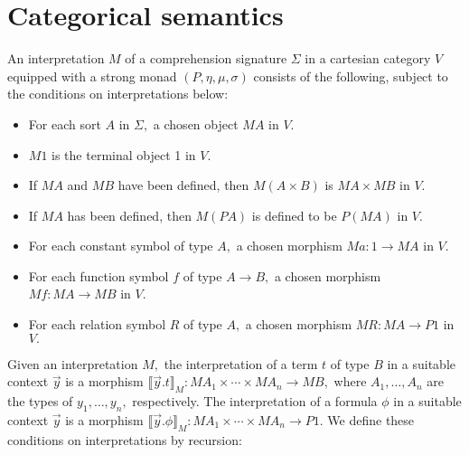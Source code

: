 \documentclass{article}
\newcommand{\maps}{\colon}
\newcommand{\interp}[1]{\llbracket #1 \rrbracket}
\begin{document}
\section{Categorical semantics}
An interpretation $M$ of a comprehension signature $\Sigma$ in a cartesian category $V$ equipped with a strong monad $(P, \eta, \mu, \sigma)$ consists of the following, subject to the conditions on interpretations below:
\begin{itemize}
  \item For each sort $A$ in $\Sigma,$ a chosen object $MA$ in $V.$
  \item $M1$ is the terminal object 1 in $V.$
  \item If $MA$ and $MB$ have been defined, then $M(A\times B)$ is $MA \times MB$ in $V.$
  \item If $MA$ has been defined, then $M(PA)$ is defined to be $P(MA)$ in $V.$
  \item For each constant symbol of type $A,$ a chosen morphism $Ma\maps 1 \to MA$ in $V.$
  \item For each function symbol $f$ of type $A \to B,$ a chosen morphism $Mf\maps MA \to MB$ in $V.$
  \item For each relation symbol $R$ of type $A,$ a chosen morphism $MR\maps MA \to P1$ in $V.$
\end{itemize}
Given an interpretation $M,$ the interpretation of a term $t$ of type $B$ in a suitable context $\vec{y}$ is a morphism ${\interp{\vec{y}.t}_M\maps MA_1 \times \cdots \times MA_n \to MB,}$ where $A_1, \ldots, A_n$ are the types of $y_1, \ldots, y_n,$ respectively.  The interpretation of a formula $\phi$ in a suitable context $\vec{y}$ is a morphism $\interp{\vec{y}.\phi}_M\maps MA_1\times \cdots \times MA_n \to P1.$  We define these conditions on interpretations by recursion:
\end{document}

